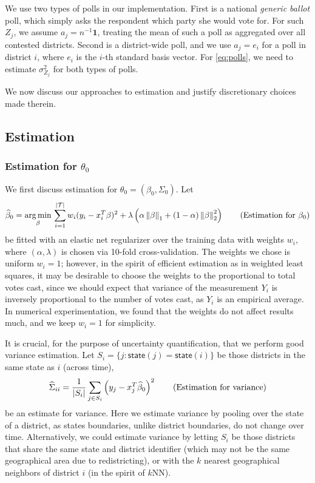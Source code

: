 \documentclass[11pt]{article}
\begin{document}
We use two types of polls in our implementation. First is a national
\emph{generic ballot} poll, which simply asks the respondent which party she
would vote for. For such $Z_j$, we assume $a_j = n^{-1} \bm 1$, treating the
mean of such a poll as aggregated over all contested districts. Second is a
district-wide poll, and we use $a_j = e_i$ for a poll in district $i$, where
$e_i$ is the $i$-th standard basis vector. For \eqref{eq:polls}, we need to
estimate $\sigma_{Z_j}^2$ for both types of polls.

We now discuss our approaches to estimation and justify discretionary choices
made therein. 

\subsection{Estimation}
\label{sec:estimate}
\subsubsection{Estimation for $\theta_0$}
We first discuss estimation for $\theta_0 = (\beta_0, \Sigma_0)$.
Let \begin{equation}
\widehat \beta_0 = \operatorname*{arg\,min}_\beta \, \sum_{i=1}^{|\mathcal T|} w_i (y_i - x_i^T
\beta)^2
+ \lambda
\left({\alpha \left\lVert\beta\right\rVert_1 + (1-\alpha) \left\lVert\beta\right\rVert_2^2}\right)
\tag{Estimation for $\beta_0$}
\label{eq:beta}
\end{equation}
be fitted with an elastic net regularizer over the training data with weights
$w_i$,
where
$(\alpha, \lambda)$ is chosen via 10-fold cross-validation. The weights we chose is uniform $w_i = 1$; however, in the spirit of efficient
estimation as in weighted least
squares, it may be desirable to choose the weights to the proportional to total
votes cast, since we should expect that variance of the measurement $Y_i$ is
inversely proportional to the number of votes cast, as $Y_i$ is an empirical
average. In numerical experimentation, we found that the weights do not affect
results much, and we keep $w_i = 1$ for simplicity.

It is crucial, for the purpose of uncertainty quantification, that we perform good variance estimation. Let $S_i = \{j: \mathsf{state}(j) = 
\mathsf{state}(i)\}$ be those districts in the same state as $i$ (across time),
\[
\widehat \Sigma_{ii} = \frac{1}{|S_i|} \sum_{j\in S_i}
\left({y_j
- x_j^T \widehat \beta_0}\right)^2 \tag{Estimation for variance}
\label{eq:var}
\]
be an estimate for variance. Here we estimate variance by pooling over the state
of a district, as states boundaries, unlike district boundaries, do not change
over time. Alternatively, we could estimate variance by letting $S_i$ be those
districts that share the same state and district identifier (which may not be
the same geographical area due to redistricting), or with the $k$ nearest geographical neighbors of district $i$ (in the spirit of $k$NN). 
\end{document}
